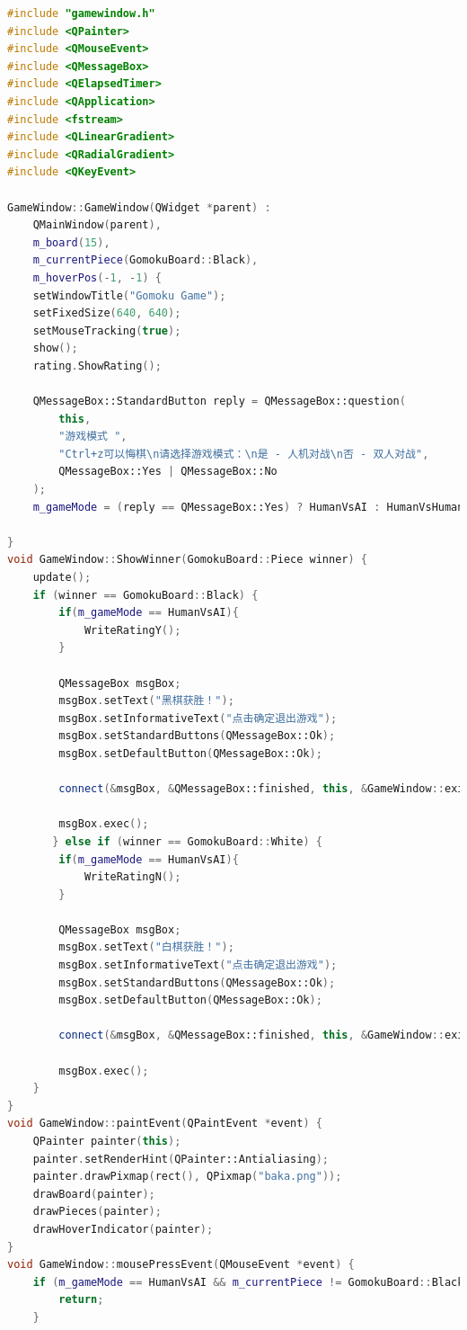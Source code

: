 \documentclass[UTF8]{ctexart}
\begin{document}
\begin{lstlisting}[language=C++]
#include "gamewindow.h"
#include <QPainter>
#include <QMouseEvent>
#include <QMessageBox>
#include <QElapsedTimer>
#include <QApplication>
#include <fstream>
#include <QLinearGradient>
#include <QRadialGradient>
#include <QKeyEvent> 

GameWindow::GameWindow(QWidget *parent) : 
    QMainWindow(parent),
    m_board(15), 
    m_currentPiece(GomokuBoard::Black), 
    m_hoverPos(-1, -1) {
    setWindowTitle("Gomoku Game");
    setFixedSize(640, 640);
    setMouseTracking(true);
    show();
    rating.ShowRating();

    QMessageBox::StandardButton reply = QMessageBox::question(
        this,
        "游戏模式 ",
        "Ctrl+z可以悔棋\n请选择游戏模式：\n是 - 人机对战\n否 - 双人对战",
        QMessageBox::Yes | QMessageBox::No
    );
    m_gameMode = (reply == QMessageBox::Yes) ? HumanVsAI : HumanVsHuman;
    
}
void GameWindow::ShowWinner(GomokuBoard::Piece winner) {
    update();
    if (winner == GomokuBoard::Black) {
        if(m_gameMode == HumanVsAI){
            WriteRatingY();
        }

        QMessageBox msgBox;
        msgBox.setText("黑棋获胜！");
        msgBox.setInformativeText("点击确定退出游戏");
        msgBox.setStandardButtons(QMessageBox::Ok);
        msgBox.setDefaultButton(QMessageBox::Ok);

        connect(&msgBox, &QMessageBox::finished, this, &GameWindow::exitGame);

        msgBox.exec();
       } else if (winner == GomokuBoard::White) {
        if(m_gameMode == HumanVsAI){
            WriteRatingN();
        }

        QMessageBox msgBox;
        msgBox.setText("白棋获胜！");
        msgBox.setInformativeText("点击确定退出游戏");
        msgBox.setStandardButtons(QMessageBox::Ok);
        msgBox.setDefaultButton(QMessageBox::Ok);

        connect(&msgBox, &QMessageBox::finished, this, &GameWindow::exitGame);

        msgBox.exec(); 
    }
}
void GameWindow::paintEvent(QPaintEvent *event) {
    QPainter painter(this); 
    painter.setRenderHint(QPainter::Antialiasing);
    painter.drawPixmap(rect(), QPixmap("baka.png"));
    drawBoard(painter);
    drawPieces(painter);
    drawHoverIndicator(painter);
}
void GameWindow::mousePressEvent(QMouseEvent *event) {
    if (m_gameMode == HumanVsAI && m_currentPiece != GomokuBoard::Black) {
        return;
    }


\end{lstlisting}
\end{document}
